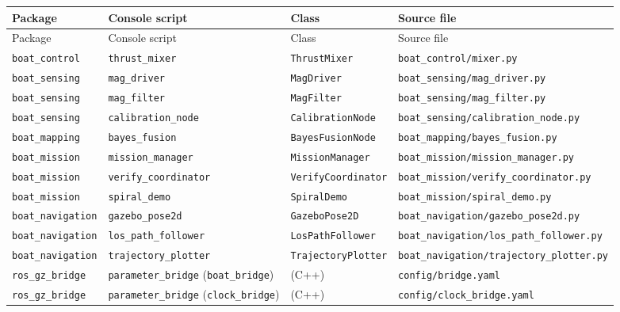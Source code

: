 \begin{center}
\small
\begin{longtable}{@{}lllp{5.2cm}@{}}
\toprule
Package & Console script & Class & Source file \\
\midrule
\endfirsthead
\toprule
Package & Console script & Class & Source file \\
\midrule
\endhead
\texttt{boat\_control} & \texttt{thrust\_mixer} & \texttt{ThrustMixer} & \texttt{boat\_control/mixer.py} \\
\texttt{boat\_sensing} & \texttt{mag\_driver} & \texttt{MagDriver} & \texttt{boat\_sensing/mag\_driver.py} \\
\texttt{boat\_sensing} & \texttt{mag\_filter} & \texttt{MagFilter} & \texttt{boat\_sensing/mag\_filter.py} \\
\texttt{boat\_sensing} & \texttt{calibration\_node} & \texttt{CalibrationNode} & \texttt{boat\_sensing/calibration\_node.py} \\
\texttt{boat\_mapping} & \texttt{bayes\_fusion} & \texttt{BayesFusionNode} & \texttt{boat\_mapping/bayes\_fusion.py} \\
\texttt{boat\_mission} & \texttt{mission\_manager} & \texttt{MissionManager} & \texttt{boat\_mission/mission\_manager.py} \\
\texttt{boat\_mission} & \texttt{verify\_coordinator} & \texttt{VerifyCoordinator} & \texttt{boat\_mission/verify\_coordinator.py} \\
\texttt{boat\_mission} & \texttt{spiral\_demo} & \texttt{SpiralDemo} & \texttt{boat\_mission/spiral\_demo.py} \\
\texttt{boat\_navigation} & \texttt{gazebo\_pose2d} & \texttt{GazeboPose2D} & \texttt{boat\_navigation/gazebo\_pose2d.py} \\
\texttt{boat\_navigation} & \texttt{los\_path\_follower} & \texttt{LosPathFollower} & \texttt{boat\_navigation/los\_path\_follower.py} \\
\texttt{boat\_navigation} & \texttt{trajectory\_plotter} & \texttt{TrajectoryPlotter} & \texttt{boat\_navigation/trajectory\_plotter.py} \\
\texttt{ros\_gz\_bridge} & \texttt{parameter\_bridge} (\texttt{boat\_bridge}) & (C++) & \texttt{config/bridge.yaml} \\
\texttt{ros\_gz\_bridge} & \texttt{parameter\_bridge} (\texttt{clock\_bridge}) & (C++) & \texttt{config/clock\_bridge.yaml} \\
\bottomrule
\end{longtable}
\end{center}




